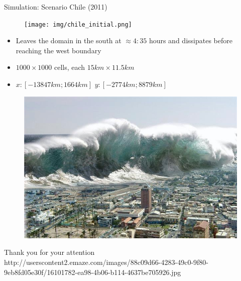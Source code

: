 \documentclass[shortpres]{beamer}
\newcommand{\imgfullscale}{0.75}
\begin{document}
\begin{frame}{Simulation: Scenario Chile (2011)}
	\begin{figure}
		\texttt{[image: img/chile\_initial.png]}
	\end{figure}
	\begin{itemize}
		\item Leaves the domain in the south at $\approx 4:35$ hours and dissipates before reaching the west boundary
		\item $1000 \times 1000$ cells, each $15 km \times 11.5 km$
		\item $x: [-13847 km; 1664 km]$ \hspace{10pt} $y: [-2774 km; 8879 km]$
	\end{itemize}
\end{frame}	
	
\begin{frame}{}
	\begin{figure}
		\includegraphics[clip, width=\imgfullscale\linewidth]{img/tsunami.jpg}
	\end{figure}
	\centering
	Thank you for your attention
	\\
	\vfill
	\flushleft
	{\fontsize{5}{5} \selectfont http://userscontent2.emaze.com/images/88c09d66-4283-49c0-9f80-9eb8fd05e30f/16101782-ea98-4b06-b114-4637be705926.jpg}
\end{frame}
\end{document}
